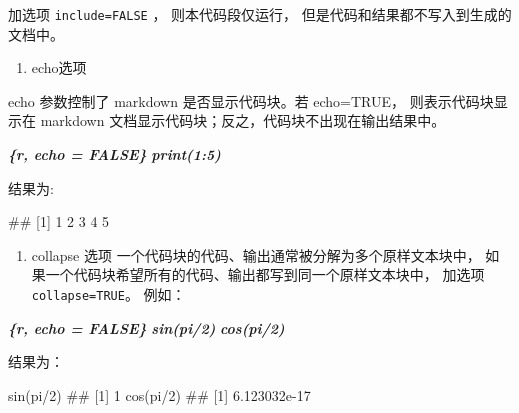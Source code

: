 \documentclass[
]{book}
\newenvironment{Shaded}{\begin{snugshade}}{\end{snugshade}}
\newcommand{\FunctionTok}[1]{\textcolor[rgb]{0.00,0.00,0.00}{#1}}
\newcommand{\InformationTok}[1]{\textcolor[rgb]{0.56,0.35,0.01}{\textbf{\textit{#1}}}}
\newcommand{\NormalTok}[1]{#1}
\providecommand{\tightlist}{%
  \setlength{\itemsep}{0pt}\setlength{\parskip}{0pt}}
\begin{document}
加选项 \texttt{include=FALSE} ， 则本代码段仅运行，
但是代码和结果都不写入到生成的文档中。

\begin{enumerate}
\def\labelenumi{\arabic{enumi}.}
\setcounter{enumi}{1}
\tightlist
\item
  echo选项
\end{enumerate}

echo 参数控制了 markdown 是否显示代码块。若 echo=TRUE，
则表示代码块显示在 markdown
文档显示代码块；反之，代码块不出现在输出结果中。

\begin{Shaded}
\begin{Highlighting}[]
\InformationTok{\textasciigrave{}\textasciigrave{}\textasciigrave{}\{r, echo = FALSE\} }
\InformationTok{print(1:5)}
\InformationTok{\textasciigrave{}\textasciigrave{}\textasciigrave{}}
\end{Highlighting}
\end{Shaded}

结果为:

\begin{Shaded}
\begin{Highlighting}[]
\FunctionTok{\#\# [1] 1 2 3 4 5}
\end{Highlighting}
\end{Shaded}

\begin{enumerate}
\def\labelenumi{\arabic{enumi}.}
\setcounter{enumi}{2}
\tightlist
\item
  collapse 选项 一个代码块的代码、输出通常被分解为多个原样文本块中，
  如果一个代码块希望所有的代码、输出都写到同一个原样文本块中， 加选项
  \texttt{collapse=TRUE}。 例如：
\end{enumerate}

\begin{Shaded}
\begin{Highlighting}[]
\InformationTok{\textasciigrave{}\textasciigrave{}\textasciigrave{}\{r, echo = FALSE\} }
\InformationTok{sin(pi/2)}
\InformationTok{cos(pi/2)}
\InformationTok{\textasciigrave{}\textasciigrave{}\textasciigrave{}}
\end{Highlighting}
\end{Shaded}

结果为：

\begin{Shaded}
\begin{Highlighting}[]
\NormalTok{sin(pi/2)}
\FunctionTok{\#\# [1] 1}
\NormalTok{cos(pi/2)}
\FunctionTok{\#\# [1] 6.123032e{-}17}
\end{Highlighting}
\end{Shaded}
\end{document}
